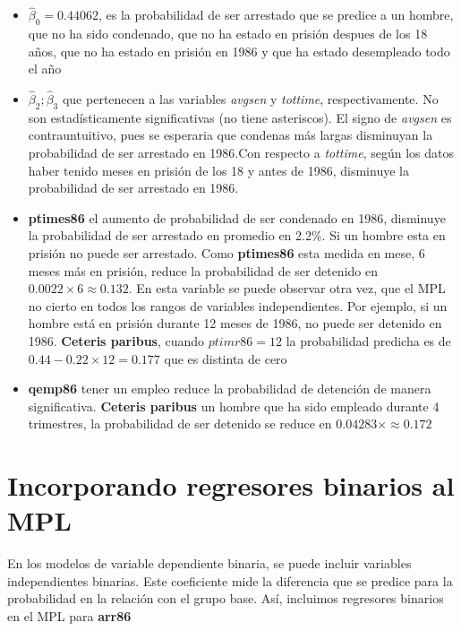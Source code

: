 \documentclass[
  letterpaper,
  DIV=11,
  numbers=noendperiod]{scrreprt}
\begin{document}
\begin{itemize}
\item
  \(\widehat{\beta}_0=0.44062\), es la probabilidad de ser arrestado que
  se predice a un hombre, que no ha sido condenado, que no ha estado en
  prisión despues de los 18 años, que no ha estado en prisión en 1986 y
  que ha estado desempleado todo el año
\item
  \(\widehat{\beta}_2; \widehat{\beta}_3\) que pertenecen a las
  variables \emph{avgsen} y \emph{tottime}, respectivamente. No son
  estadísticamente significativas (no tiene asteriscos). El signo de
  \emph{avgsen} es contrauntuitivo, pues se esperaria que condenas más
  largas disminuyan la probabilidad de ser arrestado en 1986.Con
  respecto a \emph{tottime}, según los datos haber tenido meses en
  prisión de los 18 y antes de 1986, disminuye la probabilidad de ser
  arrestado en 1986.
\item
  \textbf{ptimes86} el aumento de probabilidad de ser condenado en 1986,
  disminuye la probabilidad de ser arrestado en promedio en 2.2\%. Si un
  hombre esta en prisión no puede ser arrestado. Como \textbf{ptimes86}
  esta medida en mese, 6 meses más en prisión, reduce la probabilidad de
  ser detenido en \(0.0022\times6\approx0.132\). En esta variable se
  puede observar otra vez, que el MPL no cierto en todos los rangos de
  variables independientes. Por ejemplo, si un hombre está en prisión
  durante 12 meses de 1986, no puede ser detenido en 1986.
  \textbf{Ceteris paribus}, cuando \(ptimr86=12\) la probabilidad
  predicha es de \(0.44-0.22\times12=0.177\) que es distinta de cero
\item
  \textbf{qemp86} tener un empleo reduce la probabilidad de detención de
  manera significativa. \textbf{Ceteris paribus} un hombre que ha sido
  empleado durante 4 trimestres, la probabilidad de ser detenido se
  reduce en \(0.04283\times\approx0.172\)
\end{itemize}

\section{Incorporando regresores binarios al
MPL}\label{incorporando-regresores-binarios-al-mpl}

En los modelos de variable dependiente binaria, se puede incluir
variables independientes binarias. Este coeficiente mide la diferencia
que se predice para la probabilidad en la relación con el grupo base.
Así, incluimos regresores binarios en el MPL para \textbf{arr86}
\end{document}
